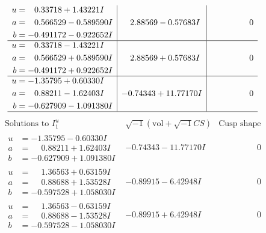 \documentclass[1p]{elsarticle_modified}
\theoremstyle{definition}
\newcommand{\I}{\sqrt{-1}}
\begin{document}
$$\begin{array}{c|c|c}
\begin{aligned}
u &= \phantom{-}0.33718 + 1.43221 I \\
a &= \phantom{-}0.566529 - 0.589590 I \\
b &= -0.491172 - 0.922652 I\end{aligned}
 & \phantom{-}2.88569 - 0.57683 I & \phantom{-0.000000 } 0 \\ \hline\begin{aligned}
u &= \phantom{-}0.33718 - 1.43221 I \\
a &= \phantom{-}0.566529 + 0.589590 I \\
b &= -0.491172 + 0.922652 I\end{aligned}
 & \phantom{-}2.88569 + 0.57683 I & \phantom{-0.000000 } 0 \\ \hline\begin{aligned}
u &= -1.35795 + 0.60330 I \\
a &= \phantom{-}0.88211 - 1.62403 I \\
b &= -0.627909 - 1.091380 I\end{aligned}
 & -0.74343 + 11.77170 I & \phantom{-0.000000 } 0\\
 \hline 
 \end{array}$$\newpage$$\begin{array}{c|c|c}  
\text{Solutions to }I^u_{1}& \I (\text{vol} + \sqrt{-1}CS) & \text{Cusp shape}\\
 \hline 
\begin{aligned}
u &= -1.35795 - 0.60330 I \\
a &= \phantom{-}0.88211 + 1.62403 I \\
b &= -0.627909 + 1.091380 I\end{aligned}
 & -0.74343 - 11.77170 I & \phantom{-0.000000 } 0 \\ \hline\begin{aligned}
u &= \phantom{-}1.36563 + 0.63159 I \\
a &= \phantom{-}0.88688 + 1.53528 I \\
b &= -0.597528 + 1.058030 I\end{aligned}
 & -0.89915 - 6.42948 I & \phantom{-0.000000 } 0 \\ \hline\begin{aligned}
u &= \phantom{-}1.36563 - 0.63159 I \\
a &= \phantom{-}0.88688 - 1.53528 I \\
b &= -0.597528 - 1.058030 I\end{aligned}
 & -0.89915 + 6.42948 I & \phantom{-0.000000 } 0 \\ \hline\begin{aligned}

\end{aligned}
\end{array}$$
\end{document}
